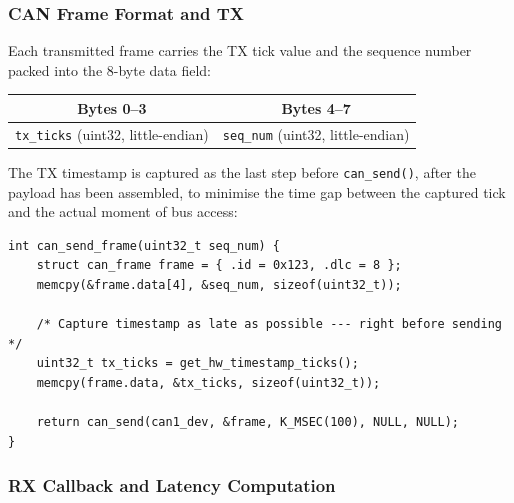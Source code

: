 \documentclass[11pt,a4paper]{article}
\begin{document}
\subsubsection{CAN Frame Format and TX}

Each transmitted frame carries the TX tick value and the sequence number packed into the
8-byte data field:

\begin{center}
\begin{tabular}{|c|c|c|c|c|c|c|c|}
    \hline
    \multicolumn{4}{|c|}{\textbf{Bytes 0--3}} & \multicolumn{4}{c|}{\textbf{Bytes 4--7}} \\
    \hline
    \multicolumn{4}{|c|}{\texttt{tx\_ticks} (uint32, little-endian)} &
    \multicolumn{4}{c|}{\texttt{seq\_num} (uint32, little-endian)} \\
    \hline
\end{tabular}
\end{center}

The TX timestamp is captured as the last step before \texttt{can\_send()}, after the
payload has been assembled, to minimise the time gap between the captured tick and
the actual moment of bus access:

\begin{lstlisting}[style=cstyle, caption={can\_handler.c --- TX frame construction}]
int can_send_frame(uint32_t seq_num) {
    struct can_frame frame = { .id = 0x123, .dlc = 8 };
    memcpy(&frame.data[4], &seq_num, sizeof(uint32_t));

    /* Capture timestamp as late as possible --- right before sending */
    uint32_t tx_ticks = get_hw_timestamp_ticks();
    memcpy(frame.data, &tx_ticks, sizeof(uint32_t));

    return can_send(can1_dev, &frame, K_MSEC(100), NULL, NULL);
}
\end{lstlisting}

\subsubsection{RX Callback and Latency Computation}
\end{document}
